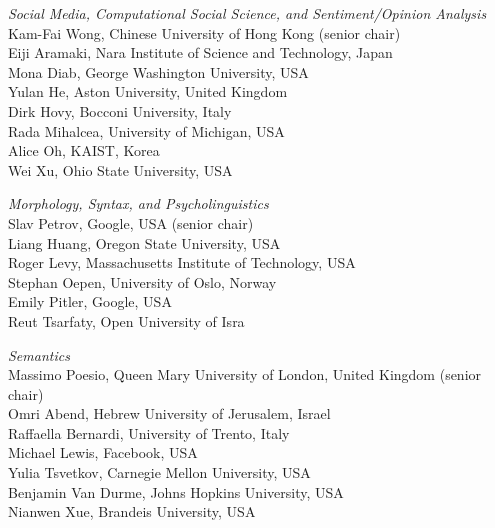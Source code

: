 \emph{Social Media, Computational Social Science, and Sentiment/Opinion Analysis}\\
\hspace*{0.2in}Kam-Fai Wong, Chinese University of Hong Kong (senior chair)\\
\hspace*{0.2in}Eiji Aramaki, Nara Institute of Science and Technology, Japan\\
\hspace*{0.2in}Mona Diab, George Washington University, USA\\
\hspace*{0.2in}Yulan He, Aston University, United Kingdom\\
\hspace*{0.2in}Dirk Hovy, Bocconi University, Italy\\
\hspace*{0.2in}Rada Mihalcea, University of Michigan, USA\\
\hspace*{0.2in}Alice Oh, KAIST, Korea\\
\hspace*{0.2in}Wei Xu, Ohio State University, USA



\emph{Morphology, Syntax, and Psycholinguistics} \\
\hspace*{0.2in}Slav Petrov, Google, USA (senior chair)\\
\hspace*{0.2in}Liang Huang, Oregon State University, USA\\
\hspace*{0.2in}Roger Levy, Massachusetts Institute of Technology, USA\\
\hspace*{0.2in}Stephan Oepen, University of Oslo, Norway\\
\hspace*{0.2in}Emily Pitler, Google, USA\\
\hspace*{0.2in}Reut Tsarfaty, Open University of Isra

\emph{Semantics} \\
\hspace*{0.2in}Massimo Poesio, Queen Mary University of London, United Kingdom (senior chair)\\
\hspace*{0.2in}Omri Abend, Hebrew University of Jerusalem, Israel\\
\hspace*{0.2in}Raffaella Bernardi, University of Trento, Italy\\
\hspace*{0.2in}Michael Lewis, Facebook, USA\\
\hspace*{0.2in}Yulia Tsvetkov, Carnegie Mellon University, USA\\
\hspace*{0.2in}Benjamin Van Durme, Johns Hopkins University, USA\\
\hspace*{0.2in}Nianwen Xue, Brandeis University, USA

